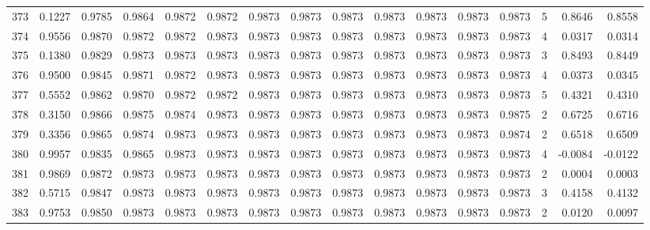 \begin{tabular}{lrrrrrrrrrrrrrrr}
373 &      0.1227 &  0.9785 &  0.9864 &  0.9872 &  0.9872 &  0.9873 &  0.9873 &  0.9873 &  0.9873 &  0.9873 &   0.9873 &     0.9873 &      5 &                    0.8646 &                     0.8558 \\
374 &      0.9556 &  0.9870 &  0.9872 &  0.9872 &  0.9873 &  0.9873 &  0.9873 &  0.9873 &  0.9873 &  0.9873 &   0.9873 &     0.9873 &      4 &                    0.0317 &                     0.0314 \\
375 &      0.1380 &  0.9829 &  0.9873 &  0.9873 &  0.9873 &  0.9873 &  0.9873 &  0.9873 &  0.9873 &  0.9873 &   0.9873 &     0.9873 &      3 &                    0.8493 &                     0.8449 \\
376 &      0.9500 &  0.9845 &  0.9871 &  0.9872 &  0.9873 &  0.9873 &  0.9873 &  0.9873 &  0.9873 &  0.9873 &   0.9873 &     0.9873 &      4 &                    0.0373 &                     0.0345 \\
377 &      0.5552 &  0.9862 &  0.9870 &  0.9872 &  0.9872 &  0.9873 &  0.9873 &  0.9873 &  0.9873 &  0.9873 &   0.9873 &     0.9873 &      5 &                    0.4321 &                     0.4310 \\
378 &      0.3150 &  0.9866 &  0.9875 &  0.9874 &  0.9873 &  0.9873 &  0.9873 &  0.9873 &  0.9873 &  0.9873 &   0.9873 &     0.9875 &      2 &                    0.6725 &                     0.6716 \\
379 &      0.3356 &  0.9865 &  0.9874 &  0.9873 &  0.9873 &  0.9873 &  0.9873 &  0.9873 &  0.9873 &  0.9873 &   0.9873 &     0.9874 &      2 &                    0.6518 &                     0.6509 \\
380 &      0.9957 &  0.9835 &  0.9865 &  0.9873 &  0.9873 &  0.9873 &  0.9873 &  0.9873 &  0.9873 &  0.9873 &   0.9873 &     0.9873 &      4 &                   -0.0084 &                    -0.0122 \\
381 &      0.9869 &  0.9872 &  0.9873 &  0.9873 &  0.9873 &  0.9873 &  0.9873 &  0.9873 &  0.9873 &  0.9873 &   0.9873 &     0.9873 &      2 &                    0.0004 &                     0.0003 \\
382 &      0.5715 &  0.9847 &  0.9873 &  0.9873 &  0.9873 &  0.9873 &  0.9873 &  0.9873 &  0.9873 &  0.9873 &   0.9873 &     0.9873 &      3 &                    0.4158 &                     0.4132 \\
383 &      0.9753 &  0.9850 &  0.9873 &  0.9873 &  0.9873 &  0.9873 &  0.9873 &  0.9873 &  0.9873 &  0.9873 &   0.9873 &     0.9873 &      2 &                    0.0120 &                     0.0097 \\

\end{tabular}
